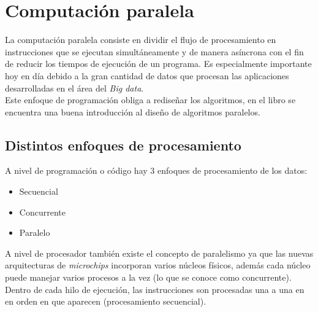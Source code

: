 
\chapter{Computación paralela}
La computación paralela consiste en dividir el flujo de procesamiento en instrucciones que se ejecutan 
simultáneamente y de manera asíncrona con el fin de reducir los tiempos de ejecución de un programa.
Es especialmente importante hoy en día debido a la gran cantidad de datos que procesan las aplicaciones 
desarrolladas en el área del \textit{Big data}.\\
Este enfoque de programación obliga a rediseñar los algoritmos, en el libro \cite{DBLP:books/cu/C2017}
se encuentra una buena introducción al diseño de algoritmos paralelos.

\section[Enfoques procesamiento]{Distintos enfoques de procesamiento}\label{sec:distintos_enfoques_procesamiento}
A nivel de programación o código hay 3 enfoques de procesamiento de los datos:

\begin{itemize}
  \item Secuencial
  \item Concurrente
  \item Paralelo
\end{itemize}

A nivel de procesador también existe el concepto de paralelismo ya que las nuevas arquitecturas de \textit{microchips}
incorporan varios núcleos físicos, además cada núcleo puede manejar varios procesos a la vez 
(lo que se conoce como concurrente). Dentro de cada hilo de ejecución, las instrucciones son procesadas una a una en 
en orden en que aparecen (procesamiento secuencial).
\newline

